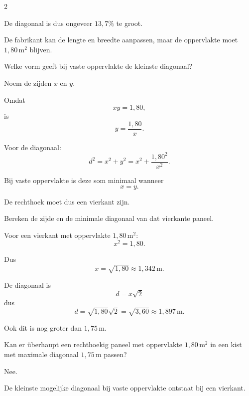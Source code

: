 \documentclass{ximera}
\begin{document}
\begin{oefening}{\oefG}
\begin{multicols}{2}
\begin{question}
\begin{oplossing}
    De diagonaal is dus ongeveer $13{,}7\%$ te groot.
    \end{oplossing}
    \end{question}
    
    
    \begin{question}
    De fabrikant kan de lengte en breedte aanpassen, maar de oppervlakte moet
    $1{,}80\,\mathrm{m^2}$ blijven.
    
    Welke vorm geeft bij vaste oppervlakte de kleinste diagonaal?
    
    \begin{oplossing}
    Noem de zijden $x$ en $y$.
    
    Omdat
    \[
    xy=1{,}80,
    \]
    is
    \[
    y=\frac{1{,}80}{x}.
    \]
    
    Voor de diagonaal:
    \[
    d^2=x^2+y^2
    =x^2+\frac{1{,}80^2}{x^2}.
    \]
    
    Bij vaste oppervlakte is deze som minimaal wanneer
    \[
    x=y.
    \]
    
    De rechthoek moet dus een vierkant zijn.
    \end{oplossing}
    \end{question}
    
    
    \begin{question}
    Bereken de zijde en de minimale diagonaal van dat vierkante paneel.
    
    \begin{oplossing}
    Voor een vierkant met oppervlakte $1{,}80\,\mathrm{m^2}$:
    \[
    x^2=1{,}80.
    \]
    
    Dus
    \[
    x=\sqrt{1{,}80}
    \approx1{,}342\,\mathrm m.
    \]
    
    De diagonaal is
    \[
    d=x\sqrt2
    \]
    dus
    \[
    d=\sqrt{1{,}80}\sqrt2
    =\sqrt{3{,}60}
    \approx1{,}897\,\mathrm m.
    \]
    
    Ook dit is nog groter dan $1{,}75\,\mathrm m$.
    \end{oplossing}
    \end{question}
    
    
    \begin{question}
    Kan er überhaupt een rechthoekig paneel met oppervlakte
    $1{,}80\,\mathrm{m^2}$ in een kist met maximale diagonaal
    $1{,}75\,\mathrm m$ passen?
    
    \begin{oplossing}
    Nee.
    
    De kleinste mogelijke diagonaal bij vaste oppervlakte ontstaat bij een vierkant.
    

\end{oplossing}
\end{question}
\end{multicols}
\end{oefening}
\end{document}
